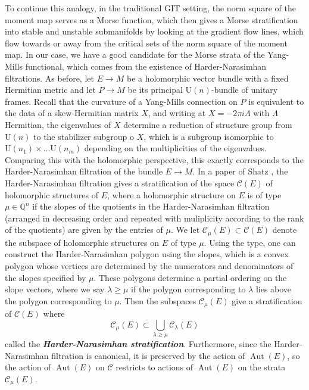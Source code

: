 \documentclass[psamsfonts, 12pt]{amsart}
\theoremstyle{definition}
\theoremstyle{remark}
\newcommand{\ib}[1]{\textbf{\textit{#1}}}
\newcommand{\Q}{\mathbb{Q}}
\DeclareMathOperator{\Aut}{Aut}
\begin{document}
To continue this analogy, in the traditional GIT setting, the norm square of the
moment map serves as a Morse function, which then gives a Morse stratification
into stable and unstable submanifolds by looking at the gradient flow lines, which
flow towards or away from the critical sets of the norm square of the moment map.
In our case, we have a good candidate for the Morse strata of the Yang-Mills
functional, which comes from the existence of Harder-Narasimhan filtrations.
As before, let $E \to M$ be a holomorphic vector bundle with a fixed Hermitian metric
and let $P \to M$ be its principal $\mathrm{U}(n)$-bundle of unitary frames. Recall
that the curvature of a Yang-Mills connection on $P$ is equivalent to the data of a
skew-Hermitian matrix $X$, and writing at $X = -2\pi i \Lambda$ with $\Lambda$
Hermitian, the eigenvalues of $X$ determine a reduction of structure group
from $\mathrm{U}(n)$ to the stabilizer subgroup o $X$, which is a subgroup isomorphic to
$\mathrm{U}(n_1) \times \ldots \mathrm{U}(n_m)$ depending on the multiplicities of the
eigenvalues. Comparing this with the holomorphic perspective, this exactly corresponds
to the Harder-Narasimhan filtration of the bundle $E \to M$. In a paper of Shatz
\cite{shatz1976}, the Harder-Narasimhan filtration gives a stratification of
the space $\mathscr{C}(E)$ of holomorphic structures of $E$, where a holomorphic
structure on $E$ is of type $\mu \in \Q^n$ if the slopes of the quotients in the
Harder-Narasimhan filtration (arranged in decreasing order and repeated
with muliplicity according to the rank of the quotients) are given by the entries
of $\mu$. We let $\mathscr{C}_\mu(E) \subset \mathscr{C}(E)$ denote the subspace
of holomorphic structures on $E$ of type $\mu$. Using the type, one can construct
the Harder-Narasimhan polygon using the slopes, which is a convex polygon whose
vertices are determined by the numerators and denominators of the slopes
specified by $\mu$. These polygons determine a partial ordering on the slope
vectors, where we say $\lambda \geq \mu$ if the polygon corresponding to $\lambda$
lies above the polygon corresponding to $\mu$. Then the subspaces
$\mathscr{C}_\mu(E)$ give a stratification of $\mathscr{C}(E)$ where
\[
\mathscr{C}_\mu(E) \subset \bigcup_{\lambda \geq \mu} \mathscr{C}_\lambda(E)
\]
called the \ib{Harder-Narasimhan stratification}. Furthermore, since the
Harder-Narasimhan filtration is canonical, it is preserved by the
action of $\Aut(E)$, so the action of $\Aut(E)$ on $\mathscr{C}$ restricts
to actions of $\Aut(E)$ on the strata $\mathscr{C}_\mu(E)$.\\
\end{document}
